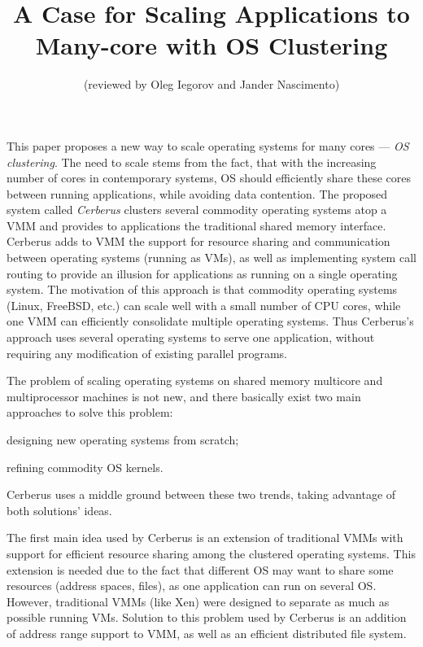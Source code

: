 \documentclass[journal]{IEEEtran}
\begin{document}
%
\title{A Case for Scaling Applications to Many-core with OS Clustering}
\author{
(reviewed by Oleg Iegorov and Jander Nascimento)}
\maketitle

This paper proposes a new way to scale operating systems for many cores
--- \emph{OS clustering}. 
The need to scale
stems from the fact, that with the increasing number of cores in
contemporary systems, OS should
efficiently share these cores between running applications, while avoiding data contention. 
The proposed
system called \emph{Cerberus} clusters several commodity operating systems atop
a VMM and provides to applications the traditional shared memory
interface.  Cerberus adds to VMM the support for resource sharing and
communication between operating systems (running as VMs), as well as implementing system
call routing to provide an illusion for applications as running on a
single operating system.  The motivation of this approach is that
commodity operating systems (Linux, FreeBSD, etc.) can scale well with a
small number of CPU cores, while one VMM can efficiently consolidate
multiple operating systems. Thus Cerberus's approach uses several
operating systems to serve one application, without requiring any
modification of existing parallel programs.

The problem of scaling operating systems on shared memory multicore and
multiprocessor machines is not new, and there basically exist two main
approaches to solve this problem:

\begin{enumerate*}
  \item designing new operating systems from scratch;
  \item refining commodity OS kernels.
\end{enumerate*}

Cerberus uses a middle ground between these two trends, taking advantage
of both solutions' ideas.

The first main idea used by Cerberus is an extension of traditional VMMs
with support for efficient resource sharing among the clustered
operating systems. This extension is needed due to the fact that
different OS may want to share some resources (address spaces, files), as
one application can run on several OS. However, traditional VMMs (like
Xen) were designed to separate as much as possible running VMs. Solution
to this problem used by Cerberus is an addition of address range support
to VMM, as well as an efficient distributed file system.
\end{document}

